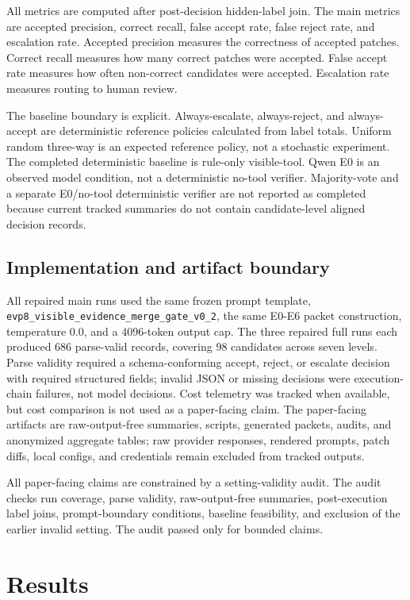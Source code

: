 \documentclass[conference]{IEEEtran}
\begin{document}
All metrics are computed after post-decision hidden-label join. The main metrics are accepted precision, correct recall, false accept rate, false reject rate, and escalation rate. Accepted precision measures the correctness of accepted patches. Correct recall measures how many correct patches were accepted. False accept rate measures how often non-correct candidates were accepted. Escalation rate measures routing to human review.

The baseline boundary is explicit. Always-escalate, always-reject, and always-accept are deterministic reference policies calculated from label totals. Uniform random three-way is an expected reference policy, not a stochastic experiment. The completed deterministic baseline is rule-only visible-tool. Qwen E0 is an observed model condition, not a deterministic no-tool verifier. Majority-vote and a separate E0/no-tool deterministic verifier are not reported as completed because current tracked summaries do not contain candidate-level aligned decision records.

\subsection{Implementation and artifact boundary}

All repaired main runs used the same frozen prompt template, \texttt{evp8\_visible\_evidence\_merge\_gate\_v0\_2}, the same E0-E6 packet construction, temperature 0.0, and a 4096-token output cap. The three repaired full runs each produced 686 parse-valid records, covering 98 candidates across seven levels. Parse validity required a schema-conforming accept, reject, or escalate decision with required structured fields; invalid JSON or missing decisions were execution-chain failures, not model decisions. Cost telemetry was tracked when available, but cost comparison is not used as a paper-facing claim. The paper-facing artifacts are raw-output-free summaries, scripts, generated packets, audits, and anonymized aggregate tables; raw provider responses, rendered prompts, patch diffs, local configs, and credentials remain excluded from tracked outputs.

All paper-facing claims are constrained by a setting-validity audit. The audit checks run coverage, parse validity, raw-output-free summaries, post-execution label joins, prompt-boundary conditions, baseline feasibility, and exclusion of the earlier invalid setting. The audit passed only for bounded claims.

\section{Results}
\end{document}
